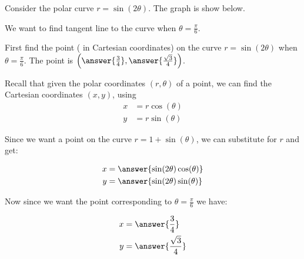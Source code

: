 \documentclass{ximera}
\author{Jason Miller}
\begin{document}
\begin{exercise}


Consider the polar curve $r=\sin(2\theta)$. The graph is show below. 




\begin{image}  
\end{image} 

We want to find tangent line to the curve when $\theta=\frac{\pi}{6}$. 

First find the point ( in Cartesian coordinates) on the curve $r=\sin(2\theta)$ when $\theta=\frac{\pi}{6}$. 
The point is $\left( \answer{ \frac{3}{4}},  \answer{ \frac{\sqrt{3}}{4}} \right)$. 

\begin{hint}

Recall that given the polar coordinates $(r,\theta)$ of a point, we can find the Cartesian coordinates $(x, y)$, using
\begin{align*}
x&=r\cos(\theta) \\
y&=r\sin(\theta)
\end{align*}

Since we want a point on the curve $r=1+\sin(\theta)$, we can substitute for $r$ and get:

\begin{align*}
x&=\answer{\sin(2\theta)\cos(\theta)} \\
y&=\answer{\sin(2\theta)\sin(\theta) }
\end{align*}

Now since we want the point corresponding to $\theta=\frac{\pi}{6}$ we have:


\begin{align*}
x&=\answer{ \frac{3}{4} } \\
y&=\answer{\frac{\sqrt{3}}{4}  }
\end{align*}


\end{hint}
\end{exercise}
\end{document}
